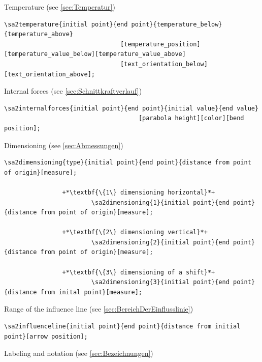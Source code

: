 \documentclass[%
  a4paper,
  BCOR=20mm,
  numbers=noenddot,
  twoside,
  parskip=half,
  openright,
  version=last,
]{scrreprt}
\begin{document}
Temperature (see \ref{sec:Temperatur})

\begin{lstlisting}[emph={temperature},backgroundcolor=\color{white}]
		\sa2temperature{initial point}{end point}{temperature_below}{temperature_above}
								[temperature_position][temperature_value_below][temperature_value_above]
								[text_orientation_below][text_orientation_above];
\end{lstlisting}\vspace{-10mm}

Internal forces (see \ref{sec:Schnittkraftverlauf})

\begin{lstlisting}[emph={internalforces},backgroundcolor=\color{white}]
		\sa2internalforces{initial point}{end point}{initial value}{end value}
							 		 [parabola height][color][bend position];
\end{lstlisting}\vspace{-10mm}

Dimensioning (see \ref{sec:Abmessungen})

\begin{lstlisting}[emph={dimensioning},backgroundcolor=\color{white}]
		\sa2dimensioning{type}{initial point}{end point}{distance from point of origin}[measure];
		
				+*\textbf{\{1\} dimensioning horizontal}*+
						\sa2dimensioning{1}{initial point}{end point}{distance from point of origin}[measure];
						
				+*\textbf{\{2\} dimensioning vertical}*+
						\sa2dimensioning{2}{initial point}{end point}{distance from point of origin}[measure];
						
				+*\textbf{\{3\} dimensioning of a shift}*+
						\sa2dimensioning{3}{initial point}{end point}{distance from inital point}[measure];
\end{lstlisting}\vspace{-10mm}

Range of the influence line (see \ref{sec:BereichDerEinflusslinie})

\begin{lstlisting}[emph={influenceline},backgroundcolor=\color{white}]
		\sa2influenceline{initial point}{end point}{distance from initial point}[arrow position];
\end{lstlisting}\vspace{-10mm}

Labeling and notation (see \ref{sec:Bezeichnungen})
\end{document}
